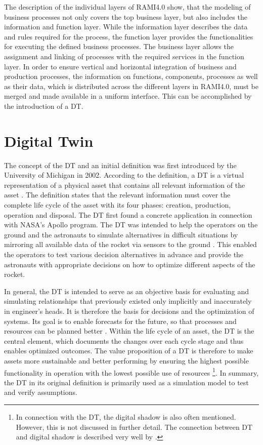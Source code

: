 The description of the individual layers of \ac{RAMI4.0} show, that the modeling of business processes not only covers the top business layer, but also includes the information and function layer. While the information layer describes the data and rules required for the process, the function layer provides the functionalities for executing the defined business processes. The business layer allows the assignment and linking of processes with the required services in the function layer. In order to ensure vertical and horizontal integration of business and production processes, the information on functions, components, processes as well as their data, which is distributed across the different layers in \ac{RAMI4.0}, must be merged and made available in a uniform interface. This can be accomplished by the introduction of a \ac{DT}.

\section{Digital Twin}\label{sec:digitaltwin}

The concept of the \ac{DT} and an initial definition was first introduced by the University of Michigan in 2002. According to the definition, a \ac{DT} is a virtual representation of a physical asset that contains all relevant information of the asset \cite[p. 92]{Grieves2017DigitalSystems}. The definition states that the relevant information must cover the complete life cycle of the asset with its four phases: creation, production, operation and disposal. The \ac{DT} first found a concrete application in connection with NASA's Apollo program. The \ac{DT} was intended to help the operators on the ground and the astronauts to simulate alternatives in difficult situations by mirroring all available data of the rocket via sensors to the ground \cite[p. 94]{Grieves2017DigitalSystems}. This enabled the operators to test various decision alternatives in advance and provide the astronauts with appropriate decisions on how to optimize different aspects of the rocket. 

In general, the \ac{DT} is intended to serve as an objective basis for evaluating and simulating relationships that previously existed only implicitly and inaccurately in engineer's heads. It is therefore the basis for decisions and the optimization of systems. Its goal is to enable forecasts for the future, so that processes and resources can be planned better \cite[p .96, p.97]{Grieves2017DigitalSystems}. Within the life cycle of an asset, the \ac{DT} is the central element, which documents the changes over each cycle stage and thus enables optimized outcomes. The value proposition of a \ac{DT} is therefore to make assets more sustainable and better performing by ensuring the highest possible functionality in operation with the lowest possible use of resources \cite[p. 102]{Grieves2017DigitalSystems}
\footnote{In connection with the \ac{DT}, the digital shadow is also often mentioned. However, this is not discussed in further detail. The connection between \ac{DT} and digital shadow is described very well by \citet[p. 5]{Malakuti2021AnTwins}.}. In summary, the \ac{DT} in its original definition is primarily used as a simulation model to test and verify assumptions.

